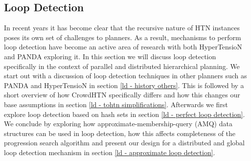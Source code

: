 \subsection{Loop Detection}
\label{improv: loop detection}
In recent years it has become clear that the recursive nature of HTN instances poses its own set of challenges to planners. As a result, mechanisms to perform loop detection have become an active area of research with both HyperTensioN \cite{magnaguagno2020hypertension} and PANDA \cite{holler2021loop} exploring it.
In this section we will discuss loop detection specifically in the context of parallel and distributed hierarchical planning. We start out with a discussion of loop detection techniques in other planners such as PANDA and HyperTensioN in section \ref{ld - history others}. This is followed by a short overview of how CrowdHTN specifically differs and how this changes our base assumptions in section \ref{ld - tohtn simplifications}. Afterwards we first explore loop detection based on hash sets in section \ref{ld - perfect loop detection}. We conclude by exploring how approximate-membership-query (AMQ) data structures can be used in loop detection, how this affects completeness of the progression search algorithm and present our design for a distributed and global loop detection mechanism in section \ref{ld - approximate loop detection}.

\begin{comment}
- loop detection in other planners
- changes in CrowdHTN as a parallel planner
- loop detection based on hash sets
- what happens if we allow false positives
- implications on completeness (and how we deal with it)
- designing a distributed loop detection mechanism with information sharing

\todo{Make sure to always talk about isomorphic task networks instead of equivalent? Quote \cite{holler2021loop}. Define isomorphism!}
\todo{quote about loop detection in graph search?}
\todo{quote about distributed loop detection in graph search?}
This section will discuss loop detection as it is used in (TO)HTN planning in general. It will start with an overview over loop detection in other HTN planners in section \ref{ld - history others}. This is followed by a discussion of the simplifying assumptions we can make for TOHTN planning in section \ref{ld - tohtn simplifications}.
- distributed loop detection (communication and merge operations become important!)
- perfect loop detection
- probabilistic loop detection (approximate membership query)
\end{comment}

